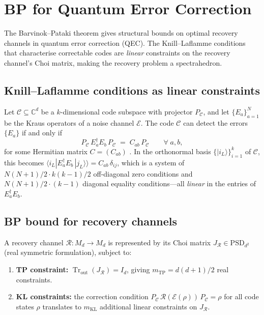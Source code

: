 \documentclass[11pt,a4paper]{article}
\theoremstyle{definition}
\newcommand{\PSD}{\mathrm{PSD}}
\newcommand{\Tr}{\operatorname{Tr}}
\newcommand{\ket}[1]{|#1\rangle}
\newcommand{\braket}[2]{\langle#1|#2\rangle}
\begin{document}
\section{BP for Quantum Error Correction}
\label{sec:qec}

The Barvinok--Pataki theorem gives structural bounds on optimal
recovery channels in quantum error correction (QEC).  The
Knill--Laflamme conditions \cite{knill_laflamme97} that characterise
correctable codes are \emph{linear} constraints on the recovery
channel's Choi matrix, making the recovery problem a spectrahedron.

\subsection{Knill--Laflamme conditions as linear constraints}

Let $\mathcal{C} \subseteq \mathbb{C}^{d}$ be a $k$-dimensional
code subspace with projector $P_\mathcal{C}$, and let
$\{E_a\}_{a=1}^N$ be the Kraus operators of a noise channel
$\mathcal{E}$.  The code $\mathcal{C}$ can detect the errors
$\{E_a\}$ if and only if
\begin{equation}\label{eq:kl}
  P_\mathcal{C}\, E_a^\dagger E_b\, P_\mathcal{C}
  \;=\; C_{ab}\, P_\mathcal{C}
  \qquad \forall\; a, b,
\end{equation}
for some Hermitian matrix $C = (C_{ab})$
\cite{knill_laflamme97, gottesman97}.  In the orthonormal basis
$\{\ket{i_L}\}_{i=1}^k$ of $\mathcal{C}$, this becomes
$\braket{i_L}{E_a^\dagger E_b\, |j_L\rangle} = C_{ab}\, \delta_{ij}$,
which is a system of $N(N{+}1)/2 \cdot k(k{-}1)/2$ off-diagonal
zero conditions and $N(N{+}1)/2 \cdot (k{-}1)$ diagonal equality
conditions---all \emph{linear} in the entries of $E_a^\dagger E_b$.

\subsection{BP bound for recovery channels}

A recovery channel $\mathcal{R} \colon M_d \to M_d$ is represented
by its Choi matrix $J_\mathcal{R} \in \PSD_{d^2}$ (real symmetric
formulation), subject to:
\begin{enumerate}
\item \textbf{TP constraint:} $\Tr_{\mathrm{out}}(J_\mathcal{R}) = I_d$,
  giving $m_{\mathrm{TP}} = d(d{+}1)/2$ real constraints.
\item \textbf{KL constraints:} the correction condition
  $P_\mathcal{C}\, \mathcal{R}(\mathcal{E}(\rho))\, P_\mathcal{C}
  = \rho$ for all code states $\rho$ translates to
  $m_{\mathrm{KL}}$ additional linear constraints on $J_\mathcal{R}$.
\end{enumerate}
\end{document}
